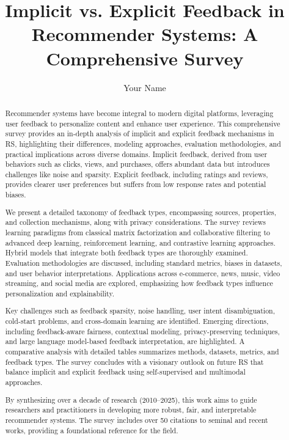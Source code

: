 \documentclass[acmsmall,review,anonymous]{acmart}
\title{Implicit vs. Explicit Feedback in Recommender Systems: A Comprehensive Survey}
\author{Your Name}
\affiliation{%
  \institution{Affiliation}
  \streetaddress{Street Address}
  \city{City}
  \state{State}
  \postcode{Postcode}
  \country{Country}}
\begin{document}
\begin{abstract}
Recommender systems have become integral to modern digital platforms, leveraging user feedback to personalize content and enhance user experience. This comprehensive survey provides an in-depth analysis of implicit and explicit feedback mechanisms in RS, highlighting their differences, modeling approaches, evaluation methodologies, and practical implications across diverse domains. Implicit feedback, derived from user behaviors such as clicks, views, and purchases, offers abundant data but introduces challenges like noise and sparsity. Explicit feedback, including ratings and reviews, provides clearer user preferences but suffers from low response rates and potential biases.

We present a detailed taxonomy of feedback types, encompassing sources, properties, and collection mechanisms, along with privacy considerations. The survey reviews learning paradigms from classical matrix factorization and collaborative filtering to advanced deep learning, reinforcement learning, and contrastive learning approaches. Hybrid models that integrate both feedback types are thoroughly examined. Evaluation methodologies are discussed, including standard metrics, biases in datasets, and user behavior interpretations. Applications across e-commerce, news, music, video streaming, and social media are explored, emphasizing how feedback types influence personalization and explainability.

Key challenges such as feedback sparsity, noise handling, user intent disambiguation, cold-start problems, and cross-domain learning are identified. Emerging directions, including feedback-aware fairness, contextual modeling, privacy-preserving techniques, and large language model-based feedback interpretation, are highlighted. A comparative analysis with detailed tables summarizes methods, datasets, metrics, and feedback types. The survey concludes with a visionary outlook on future RS that balance implicit and explicit feedback using self-supervised and multimodal approaches.

By synthesizing over a decade of research (2010--2025), this work aims to guide researchers and practitioners in developing more robust, fair, and interpretable recommender systems. The survey includes over 50 citations to seminal and recent works, providing a foundational reference for the field.
\end{abstract}

\maketitle
\end{document}
